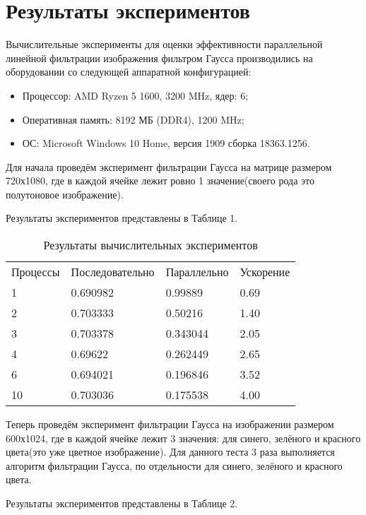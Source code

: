 \documentclass{report}
\begin{document}
\section*{Результаты экспериментов}
Вычислительные эксперименты для оценки эффективности параллельной линейной фильтрации изображения фильтром Гаусса производились на оборудовании со следующей аппаратной конфигурацией:

\begin{itemize}
\item Процессор: AMD Ryzen 5 1600, 3200 MHz, ядер: 6;
\item Оперативная память: 8192 МБ (DDR4), 1200 MHz;
\item ОС: Microsoft Windows 10 Home, версия 1909 сборка 18363.1256.
\end{itemize}

\par Для начала проведём эксперимент фильтрации Гаусса на матрице размером 720х1080, где в каждой ячейке лежит ровно 1 значение(своего рода это полутоновое изображение). 
\par Результаты экспериментов представлены в Таблице 1.

\begin{table}[!h]
\caption{Результаты вычислительных экспериментов}
\centering
\begin{tabular}{p{3cm} p{4cm} p{4cm} p{4cm}}
Процессы & Последовательно & Параллельно & Ускорение  \\
1        & 0.690982          & 0.99889     & 0.69       \\
2        & 0.703333         & 0.50216     & 1.40       \\
3        & 0.703378         & 0.343044     & 2.05       \\
4        & 0.69622         & 0.262449     & 2.65       \\
6        & 0.694021         & 0.196846     & 3.52       \\
10        & 0.703036         & 0.175538     & 4.00
\end{tabular}
\end{table}

\par Теперь проведём эксперимент фильтрации Гаусса на изображении размером 600х1024, где в каждой ячейке лежит 3 значения: для синего, зелёного и красного цвета(это уже цветное изображение). Для данного теста 3 раза выполняется алгоритм фильтрации Гаусса, по отдельности для синего, зелёного и красного цвета.
\par Результаты экспериментов представлены в Таблице 2.
\newpage
\end{document}
